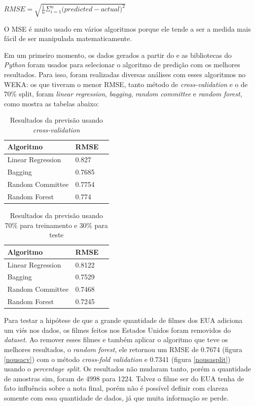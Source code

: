 $RMSE = \sqrt{\frac{1}{n}\Sigma_{i=1}^{n}{\Big({predicted-actual}\Big)^2}}$
 
O MSE é muito usado em vários algoritmos porque ele tende a ser a medida mais fácil de ser manipulada matematicamente.

Em um primeiro momento, os dados gerados a partir do \pdi e as bibliotecas do \textit{Python} foram usados para selecionar o algoritmo de predição com os melhores resultados. Para isso, foram realizadas diversas análises com esses algoritmos no WEKA: os que tiveram o menor RMSE, tanto método de \textit{cross-validation} e o de 70\% split, foram \textit{linear regression}, \textit{bagging}, \textit{random committee} e \textit{random forest}, como mostra as tabelas abaixo:

\begin{longtable}{|l|l|l|}
\caption{Resultados da previsão usando \textit{cross-validation}}
\label{cvfull}
\\ \hline
\textbf{Algoritmo} & \textbf{RMSE}  \\ \hline
Linear Regression      & 0.827                    \\ \hline
Bagging                & 0.7685                   \\ \hline
Random Committee       & 0.7754                   \\ \hline
Random Forest          & 0.774                    \\ \hline
\end{longtable}


\begin{longtable}{|l|l|l|}
\caption{Resultados da previsão usando 70\% para treinamento e 30\% para teste}
\label{splitfull}
\\\hline
\textbf{Algoritmo} & \textbf{RMSE} \\ \hline
Linear Regression      & 0.8122                   \\ \hline
Bagging                & 0.7529                   \\ \hline
Random Committee       & 0.7468                   \\ \hline
Random Forest          & 0.7245                   \\ \hline
\end{longtable}



Para testar a hipótese de que a grande quantidade de filmes dos EUA adiciona um viés nos dados, os filmes feitos nos Estados Unidos foram removidos do \textit{dataset}. Ao remover esses filmes e também aplicar o algoritmo que teve os melhores resultados, o \textit{random forest}, ele retornou um RMSE de 0.7674 (figura \ref{nousacv}) com o método \textit{cross-fold validation} e 0.7341 (figura \ref{nousasplit}) usando o \textit{percentage split}. Os resultados não mudaram tanto, porém a quantidade de amostras sim, foram de 4998 para 1224. Talvez o filme ser do EUA tenha de fato influência sobre a nota final, porém não é possível definir com clareza somente com essa quantidade de dados, já que muita informação se perde.

